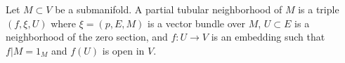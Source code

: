 Let $M \subset V$ be a submanifold. A partial tubular neighborhood of $M$ is a triple $(f,\xi,U)$ where $\xi = (p,E,M)$ is a vector bundle over $M$, $U \subset E$ is a neighborhood of the zero section, and $f: U \rightarrow V$ is an embedding such that $f|M = 1_M$ and $f(U)$ is open in $V$.

